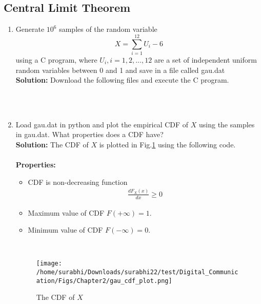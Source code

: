 \documentclass[journal,10pt,twocolumn]{IEEEtran}
\newcounter{Chapcounter}
\numberwithin{equation}{subsection}
\numberwithin{figure}{subsection}
\renewcommand\thesection{\theChapcounter.\arabic{section}}
\newcommand{\solution}{\noindent \textbf{Solution: }}
\renewcommand\thesection{\arabic{section}}
\renewcommand\thesubsection{\thesection.\arabic{subsection}}
\begin{document}
\subsection{\textbf{Central Limit Theorem}}
%
\begin{enumerate}[label=\thesubsection.\arabic*,ref=\thesubsection.\arabic{figure}]
%
\item
Generate $10^6$ samples of the random variable
%
\begin{equation}
X = \sum_{i=1}^{12}U_i -6
\end{equation}
%
using a C program, where $U_i, i = 1,2,\dots, 12$ are  a set of independent uniform random variables between 0 and 1
and save in a file called gau.dat \\
\solution Download the following files and execute the  C program.\\

\\


\
\item
Load gau.dat in python and plot the empirical CDF of $X$ using the samples in gau.dat. What properties does a CDF have?
\\
\solution The CDF of $X$ is plotted in Fig.\ref{fig:gauss_cdf} using the following code.\\

\\

\textbf{Properties:}
\begin{itemize}
\item CDF is non-decreasing function\\
\begin{align}
\frac{dF_X(x)}{dx} \ge 0
\end{align}
\item Maximum value of CDF $F(+\infty)=1$.
\item Minimum value of CDF $F(-\infty)=0$.
\end{itemize}
\
\begin{figure}[!ht]
\centering
\texttt{[image: /home/surabhi/Downloads/surabhi22/test/Digital\_Communication/Figs/Chapter2/gau\_cdf\_plot.png]}
\caption{The CDF of $X$}
\label{fig:gauss_cdf}
\end{figure}


\end{enumerate}
\end{document}
